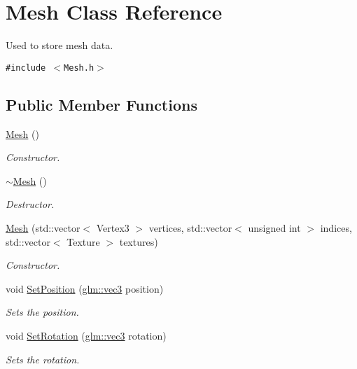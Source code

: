 \hypertarget{class_mesh}{
\section{Mesh Class Reference}
\label{class_mesh}
}
Used to store mesh data.  


{\tt \#include $<$Mesh.h$>$}

\subsection*{Public Member Functions}
\begin{CompactItemize}
\item 
\hyperlink{class_mesh_2af137f1571af89172b9c102302c416b}{Mesh} ()
\begin{CompactList}\small\item\em Constructor. \item\end{CompactList}\item 
\hyperlink{class_mesh_5efe4da1a4c0971cfb037bd70304c303}{$\sim$Mesh} ()
\begin{CompactList}\small\item\em Destructor. \item\end{CompactList}\item 
\hyperlink{class_mesh_f55e3db5357789c5de2de1f98d2cbd5b}{Mesh} (std::vector$<$ Vertex3 $>$ vertices, std::vector$<$ unsigned int $>$ indices, std::vector$<$ Texture $>$ textures)
\begin{CompactList}\small\item\em Constructor. \item\end{CompactList}\item 
void \hyperlink{class_mesh_b847f16073bd4d5c405ffbb894cb1d62}{SetPosition} (\hyperlink{group__core__types_g1c47e8b3386109bc992b6c48e91b0be7}{glm::vec3} position)
\begin{CompactList}\small\item\em Sets the position. \item\end{CompactList}\item 
void \hyperlink{class_mesh_519811cebec8a556190226ed3da06390}{SetRotation} (\hyperlink{group__core__types_g1c47e8b3386109bc992b6c48e91b0be7}{glm::vec3} rotation)
\begin{CompactList}\small\item\em Sets the rotation. \item\end{CompactList}\item 

\end{CompactItemize}
